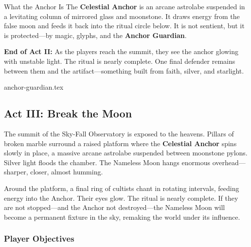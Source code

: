 \begin{CommentBox}{What the Anchor Is}
    The \textbf{Celestial Anchor} is an arcane astrolabe suspended in a levitating column of mirrored glass and moonstone. It draws energy from the false moon and feeds it back into the ritual circle below. It is not sentient, but it is protected—by magic, glyphs, and the \textbf{Anchor Guardian}.
\end{CommentBox}

\textbf{End of Act II:}
As the players reach the summit, they see the anchor glowing with unstable light. The ritual is nearly complete. One final defender remains between them and the artifact—something built from faith, silver, and starlight.


{anchor-guardian.tex}



\subsection{Act III: Break the Moon}

The summit of the Sky-Fall Observatory is exposed to the heavens. Pillars of broken marble surround a raised platform where the \textbf{Celestial Anchor} spins slowly in place, a massive arcane astrolabe suspended between moonstone pylons. Silver light floods the chamber. The Nameless Moon hangs enormous overhead—sharper, closer, almost humming.

Around the platform, a final ring of cultists chant in rotating intervals, feeding energy into the Anchor. Their eyes glow. The ritual is nearly complete. If they are not stopped—and the Anchor not destroyed—the Nameless Moon will become a permanent fixture in the sky, remaking the world under its influence.

\subsubsection{Player Objectives}

